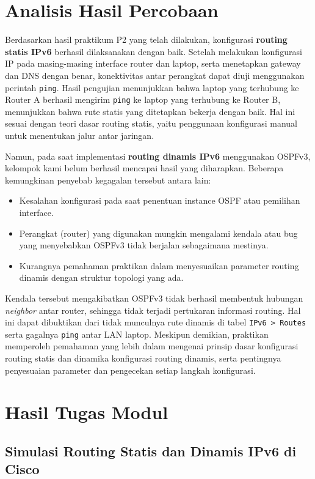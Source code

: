 \section{Analisis Hasil Percobaan}
Berdasarkan hasil praktikum P2 yang telah dilakukan, konfigurasi \textbf{routing statis IPv6} berhasil dilaksanakan dengan baik. Setelah melakukan konfigurasi IP pada masing-masing interface router dan laptop, serta menetapkan gateway dan DNS dengan benar, konektivitas antar perangkat dapat diuji menggunakan perintah \texttt{ping}. Hasil pengujian menunjukkan bahwa laptop yang terhubung ke Router A berhasil mengirim \texttt{ping} ke laptop yang terhubung ke Router B, menunjukkan bahwa rute statis yang ditetapkan bekerja dengan baik. Hal ini sesuai dengan teori dasar routing statis, yaitu penggunaan konfigurasi manual untuk menentukan jalur antar jaringan.

Namun, pada saat implementasi \textbf{routing dinamis IPv6} menggunakan OSPFv3, kelompok kami belum berhasil mencapai hasil yang diharapkan. Beberapa kemungkinan penyebab kegagalan tersebut antara lain:
\begin{itemize}
    \item Kesalahan konfigurasi pada saat penentuan instance OSPF atau pemilihan interface.
    \item Perangkat (router) yang digunakan mungkin mengalami kendala atau bug yang menyebabkan OSPFv3 tidak berjalan sebagaimana mestinya.
    \item Kurangnya pemahaman praktikan dalam menyesuaikan parameter routing dinamis dengan struktur topologi yang ada.
\end{itemize}

Kendala tersebut mengakibatkan OSPFv3 tidak berhasil membentuk hubungan \textit{neighbor} antar router, sehingga tidak terjadi pertukaran informasi routing. Hal ini dapat dibuktikan dari tidak munculnya rute dinamis di tabel \texttt{IPv6 > Routes} serta gagalnya \texttt{ping} antar LAN laptop. Meskipun demikian, praktikan memperoleh pemahaman yang lebih dalam mengenai prinsip dasar konfigurasi routing statis dan dinamika konfigurasi routing dinamis, serta pentingnya penyesuaian parameter dan pengecekan setiap langkah konfigurasi.

\section{Hasil Tugas Modul}
\subsection{Simulasi Routing Statis dan Dinamis IPv6 di Cisco}

